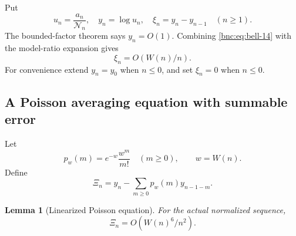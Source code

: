 \documentclass[11pt]{article}
\numberwithin{equation}{section}
\newtheorem{lemma}[theorem]{Lemma}
\theoremstyle{definition}
\theoremstyle{remark}
\begin{document}
Put
\[
 u_n=\frac{a_n}{\mathcal N_n},\quad
 y_n=\log u_n,\quad
 \xi_n=y_n-y_{n-1}\quad(n\ge1).
\]
The bounded-factor theorem says \(y_n=O(1)\).
Combining \eqref{bnc:eq:bell-14} with the model-ratio expansion gives
\begin{equation}\label{bnc:eq:bell-16}
\xi_n=O(W(n)/n).
\end{equation}
For convenience extend \(y_n=y_0\) when \(n\le0\), and set
\(\xi_n=0\) when \(n\le0\).

\subsection{A Poisson averaging equation with summable error}

Let
\[
 p_w(m)=e^{-w}\frac{w^m}{m!}\quad(m\ge0),\qquad w=W(n).
\]
Define
\[
 \Xi_n
 =y_n-\sum_{m\ge0}p_w(m)y_{n-1-m}.
\]

\begin{lemma}[Linearized Poisson equation]\label{bnc:lem:linearpoisson}
For the actual normalized sequence,
\begin{equation}\label{bnc:eq:bell-17}
\Xi_n=O(W(n)^6/n^2).
\end{equation}
\end{lemma}
\end{document}
